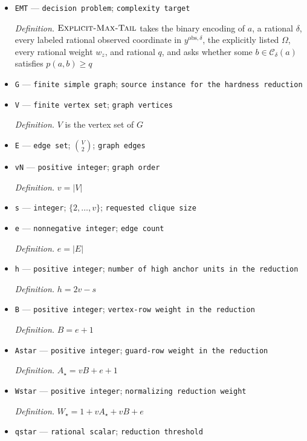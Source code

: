 \documentclass{article}
\begin{document}
\begin{itemize}
  \item \texttt{EMT} --- \texttt{decision problem}; \texttt{complexity target}
  \par\smallskip\noindent\emph{Definition.} \(\textsc{Explicit-Max-Tail}\) takes the binary encoding of \(a\), a rational \(\delta\), every labeled rational observed coordinate in \(y^{\mathrm{obs},\delta}\), the explicitly listed \(\Omega\), every rational weight \(w_z\), and rational \(q\), and asks whether some \(b\in\mathcal C_\delta(a)\) satisfies \(p(a,b)\ge q\)
  \item \texttt{G} --- \texttt{finite simple graph}; \texttt{source instance for the hardness reduction}
  \item \texttt{V} --- \texttt{finite vertex set}; \texttt{graph vertices}
  \par\smallskip\noindent\emph{Definition.} \(V\) is the vertex set of \(G\)
  \item \texttt{E} --- \texttt{edge set}; \(\binom{V}{2}\); \texttt{graph edges}
  \item \texttt{vN} --- \texttt{positive integer}; \texttt{graph order}
  \par\smallskip\noindent\emph{Definition.} \(v=|V|\)
  \item \texttt{s} --- \texttt{integer}; \(\{2,\ldots,v\}\); \texttt{requested clique size}
  \item \texttt{e} --- \texttt{nonnegative integer}; \texttt{edge count}
  \par\smallskip\noindent\emph{Definition.} \(e=|E|\)
  \item \texttt{h} --- \texttt{positive integer}; \texttt{number of high anchor units in the reduction}
  \par\smallskip\noindent\emph{Definition.} \(h=2v-s\)
  \item \texttt{B} --- \texttt{positive integer}; \texttt{vertex-\allowbreak{}row weight in the reduction}
  \par\smallskip\noindent\emph{Definition.} \(B=e+1\)
  \item \texttt{Astar} --- \texttt{positive integer}; \texttt{guard-\allowbreak{}row weight in the reduction}
  \par\smallskip\noindent\emph{Definition.} \(A_\star=vB+e+1\)
  \item \texttt{Wstar} --- \texttt{positive integer}; \texttt{normalizing reduction weight}
  \par\smallskip\noindent\emph{Definition.} \(W_\star=1+vA_\star+vB+e\)
  \item \texttt{qstar} --- \texttt{rational scalar}; \texttt{reduction threshold}

\end{itemize}
\end{document}
